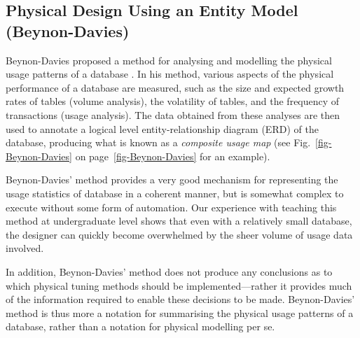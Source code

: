 \documentclass{llncs}
\begin{document}
\subsection{Physical Design Using an Entity Model (Beynon-Davies)}

Beynon-Davies proposed a method for analysing and modelling the physical
usage patterns of a database \cite{BeDa-P-1992-PDD}. In his method,
various aspects of the physical performance of a database are measured,
such as the size and expected growth rates of tables (volume analysis),
the volatility of tables, and the frequency of transactions (usage
analysis). The data obtained from these analyses are then used to
annotate a logical level entity-relationship diagram (ERD) of the
database, producing what is known as a \emph{composite usage map} (see
Fig.~\ref{fig-Beynon-Davies} on page~\ref{fig-Beynon-Davies} for an
example).

Beynon-Davies' method provides a very good mechanism for representing
the usage statistics of database in a coherent manner, but is somewhat
complex to execute without some form of automation. Our experience with
teaching this method at undergraduate level shows that even with a
relatively small database, the designer can quickly become overwhelmed
by the sheer volume of usage data involved.

In addition, Beynon-Davies' method does not produce any conclusions as
to which physical tuning methods should be implemented---rather it
provides much of the information required to enable these decisions to
be made. Beynon-Davies' method is thus more a notation for summarising
the physical usage patterns of a database, rather than a notation for
physical modelling per se.
\end{document}
